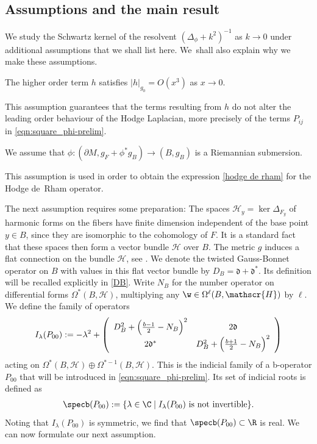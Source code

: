 \subsection{Assumptions and the main result}

We study the Schwartz kernel of the resol\-vent $(\Delta_{\phi} + k^{2})^{-1}$ as $k\to 0$ under
additional assumptions that we shall list here. We~shall also explain why we make these assumptions.

\begin{assum}\label{assum1}
The higher order term $h$ satisfies $\vert h \vert_{g_{0}} = O(x^3)$ as $x \to 0$.
\end{assum}

This assumption
guarantees that the terms resulting from $h$ do not alter the leading order behaviour of the Hodge Laplacian, more precisely of the terms $P_{ij}$ in \eqref{eqn:square_phi-prelim}.

\begin{assum}\label{assum2}
We assume that $\phi: (\partial M, g_F + \phi^*g_B)
\to (B, g_B)$ is a Riemannian submersion.
\end{assum}

This assumption is used in order to obtain the expression
\eqref{hodge de rham} for the Hodge de~Rham operator.

The next assumption requires some preparation:
The spaces $\mathscr{H}_y=\ker \Delta_{F_y}$ of harmonic forms on the fibers have
finite dimension independent of the base point $y \in B$, since they are isomorphic
to the cohomology of $F$. It is a standard fact that these spaces then form a vector bundle $\mathscr{H}$
over $B$. The metric $g$ induces a flat connection on the bundle $\mathscr{H}$, see
\cite[Prop.\,15]{gravi-ins}. We denote the twisted Gauss-Bonnet operator on $B$
with values in this flat vector bundle by $D_B = \mathfrak{d} + \mathfrak{d}^*$.
Its definition will be recalled explicitly in
\eqref{DB}. Write $N_B$ for the number operator on differential forms $\Omega^*(B,\mathscr{H})$,
multiplying any $\w \in \Omega^\ell(B,\mathscr{H})$ by $\ell$. We define the family of operators
\begin{align}\label{Indicial family}
I_\lambda(P_{00}) := -\lambda^2 + \left(\begin{array}{cc}
D^2_{B} + \Bigl(\frac{b-1}2-N_B\Bigr)^{2} &2\mathfrak{d} \\
2\mathfrak{d}^* & D^2_B + \Bigl(\frac{b+1}2-N_B\Bigr)^{2}
\end{array} \right)
\end{align}
acting on $\Omega^*(B,\mathscr{H})\oplus \Omega^{*-1}(B,\mathscr{H})$.
This is the indicial family of a b-operator $P_{00}$ that will be introduced
in \eqref{eqn:square_phi-prelim}. Its set of indicial roots is defined as
\begin{align}\label{Indicial set}
\specb(P_{00}) := \{ \lambda \in \C \mid
I_\lambda(P_{00}) \ \text{is not invertible} \}.
\end{align}
Noting that $I_\lambda(P_{00})$ is symmetric, we find that
$\specb(P_{00}) \subset \R$ is real. We can now formulate our next
assumption.

